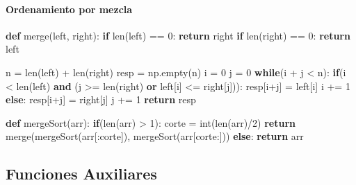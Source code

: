 \documentclass[11pt]{article}
\newenvironment{Shaded}{}{}
\newcommand{\KeywordTok}[1]{\textcolor[rgb]{0.00,0.44,0.13}{\textbf{{#1}}}}
\newcommand{\DecValTok}[1]{\textcolor[rgb]{0.25,0.63,0.44}{{#1}}}
\newcommand{\NormalTok}[1]{{#1}}
\newcommand{\ControlFlowTok}[1]{\textcolor[rgb]{0.00,0.44,0.13}{\textbf{{#1}}}}
\newcommand{\OperatorTok}[1]{\textcolor[rgb]{0.40,0.40,0.40}{{#1}}}
\newcommand{\BuiltInTok}[1]{{#1}}
\begin{document}
\paragraph{Ordenamiento por mezcla}\label{ordenamiento-por-mezcla}

\begin{Shaded}
\begin{Highlighting}[]
\KeywordTok{def}\NormalTok{ merge(left, right):}
    \ControlFlowTok{if} \BuiltInTok{len}\NormalTok{(left) }\OperatorTok{==} \DecValTok{0}\NormalTok{: }\ControlFlowTok{return}\NormalTok{ right}
    \ControlFlowTok{if} \BuiltInTok{len}\NormalTok{(right) }\OperatorTok{==} \DecValTok{0}\NormalTok{: }\ControlFlowTok{return}\NormalTok{ left}
    
\NormalTok{    n }\OperatorTok{=} \BuiltInTok{len}\NormalTok{(left) }\OperatorTok{+} \BuiltInTok{len}\NormalTok{(right)}
\NormalTok{    resp }\OperatorTok{=}\NormalTok{ np.empty(n)}
\NormalTok{    i }\OperatorTok{=} \DecValTok{0}
\NormalTok{    j }\OperatorTok{=} \DecValTok{0}
    \ControlFlowTok{while}\NormalTok{(i }\OperatorTok{+}\NormalTok{ j }\OperatorTok{<}\NormalTok{ n):}
        \ControlFlowTok{if}\NormalTok{(i }\OperatorTok{<} \BuiltInTok{len}\NormalTok{(left) }\KeywordTok{and}\NormalTok{ (j }\OperatorTok{>=} \BuiltInTok{len}\NormalTok{(right) }\KeywordTok{or}\NormalTok{ left[i] }\OperatorTok{<=}\NormalTok{ right[j])):}
\NormalTok{            resp[i}\OperatorTok{+}\NormalTok{j] }\OperatorTok{=}\NormalTok{ left[i]}
\NormalTok{            i }\OperatorTok{+=} \DecValTok{1}
        \ControlFlowTok{else}\NormalTok{:}
\NormalTok{            resp[i}\OperatorTok{+}\NormalTok{j] }\OperatorTok{=}\NormalTok{ right[j]}
\NormalTok{            j }\OperatorTok{+=} \DecValTok{1}
    \ControlFlowTok{return}\NormalTok{ resp        }

\KeywordTok{def}\NormalTok{ mergeSort(arr):}
    \ControlFlowTok{if}\NormalTok{(}\BuiltInTok{len}\NormalTok{(arr) }\OperatorTok{>} \DecValTok{1}\NormalTok{):}
\NormalTok{        corte }\OperatorTok{=} \BuiltInTok{int}\NormalTok{(}\BuiltInTok{len}\NormalTok{(arr)}\OperatorTok{/}\DecValTok{2}\NormalTok{)}
        \ControlFlowTok{return}\NormalTok{ merge(mergeSort(arr[:corte]), mergeSort(arr[corte:]))}
    \ControlFlowTok{else}\NormalTok{:}
        \ControlFlowTok{return}\NormalTok{ arr}
\end{Highlighting}
\end{Shaded}

    \subsection{Funciones Auxiliares}\label{funciones-auxiliares}
\end{document}
